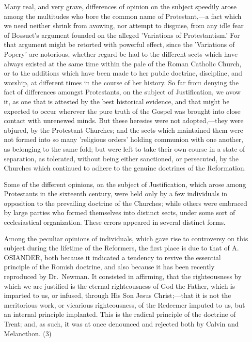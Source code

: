 \documentclass[
]{book}
\begin{document}
Many real, and very grave, differences of opinion on the subject speedily arose among the multitudes who bore the common name of Protestant,---a fact which we need neither shrink from avowing, nor attempt to disguise, from any idle fear of Bossuet's argument founded on the alleged 'Variations of Protestantism.' For that argument might be retorted with powerful effect, since the 'Variations of Popery' are notorious, whether regard be had to the different sects which have always existed at the same time within the pale of the Roman Catholic Church, or to the additions which have been made to her public doctrine, discipline, and worship, at different times in the course of her history. So far from denying the fact of differences amongst Protestants, on the subject of Justification, we avow it, as one that is attested by the best historical evidence, and that might be expected to occur wherever the pure truth of the Gospel was brought into close contact with unrenewed minds. But these heresies were not adopted,---they were abjured, by the Protestant Churches; and the sects which maintained them were not formed into so many 'religious orders' holding communion with one another, as belonging to the same fold; but were left to take their own course in a state of separation, as tolerated, without being either sanctioned, or persecuted, by the Churches which continued to adhere to the genuine doctrines of the Reformation.

Some of the different opinions, on the subject of Justification, which arose among Protestants in the sixteenth century, were held only by a few individuals in opposition to the prevailing doctrine of the Churches; while others were embraced by large parties who formed themselves into distinct sects, under some sort of ecclesiastical organization. These errors appeared in several distinct forms.

Among the peculiar opinions of individuals, which gave rise to controversy on this subject during the lifetime of the Reformers, the first place is due to that of A. OSIANDER, both because it indicated a tendency to revive the essential principle of the Romish doctrine, and also because it has been recently reproduced by Dr.~Newman. It consisted in affirming, that the righteousness by which we are justified is the eternal righteousness of God the Father, which is imparted to us, or infused, through His Son Jesus Christ;---that it is not the meritorious work, or vicarious righteousness, of the Redeemer imputed to us, but an internal principle implanted. This is the radical principle of the doctrine of Trent; and, as such, it was at once denounced and rejected both by Calvin and Melancthon. (3)
\end{document}
